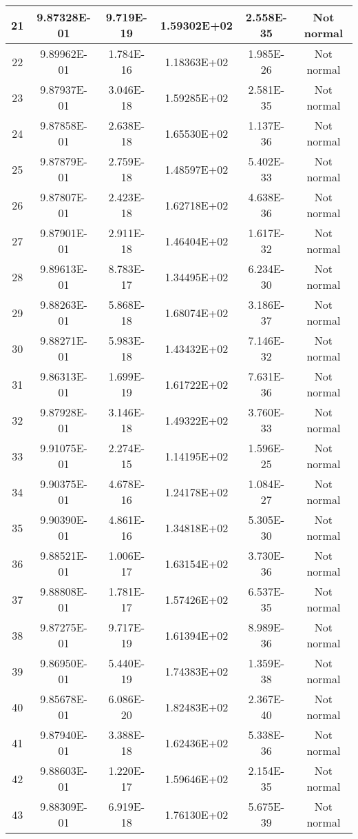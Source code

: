 \begin{table}[h]
\begin{tabular}{|c|c|c|c|c|c|}
		21 & 9.87328E-01 & 9.719E-19 & 1.59302E+02 & 2.558E-35 & Not normal\\\hline
		22 & 9.89962E-01 & 1.784E-16 & 1.18363E+02 & 1.985E-26 & Not normal\\\hline
		23 & 9.87937E-01 & 3.046E-18 & 1.59285E+02 & 2.581E-35 & Not normal\\\hline
		24 & 9.87858E-01 & 2.638E-18 & 1.65530E+02 & 1.137E-36 & Not normal\\\hline
		25 & 9.87879E-01 & 2.759E-18 & 1.48597E+02 & 5.402E-33 & Not normal\\\hline
		26 & 9.87807E-01 & 2.423E-18 & 1.62718E+02 & 4.638E-36 & Not normal\\\hline
		27 & 9.87901E-01 & 2.911E-18 & 1.46404E+02 & 1.617E-32 & Not normal\\\hline
		28 & 9.89613E-01 & 8.783E-17 & 1.34495E+02 & 6.234E-30 & Not normal\\\hline
		29 & 9.88263E-01 & 5.868E-18 & 1.68074E+02 & 3.186E-37 & Not normal\\\hline
		30 & 9.88271E-01 & 5.983E-18 & 1.43432E+02 & 7.146E-32 & Not normal\\\hline
		31 & 9.86313E-01 & 1.699E-19 & 1.61722E+02 & 7.631E-36 & Not normal\\\hline
		32 & 9.87928E-01 & 3.146E-18 & 1.49322E+02 & 3.760E-33 & Not normal\\\hline
		33 & 9.91075E-01 & 2.274E-15 & 1.14195E+02 & 1.596E-25 & Not normal\\\hline
		34 & 9.90375E-01 & 4.678E-16 & 1.24178E+02 & 1.084E-27 & Not normal\\\hline
		35 & 9.90390E-01 & 4.861E-16 & 1.34818E+02 & 5.305E-30 & Not normal\\\hline
		36 & 9.88521E-01 & 1.006E-17 & 1.63154E+02 & 3.730E-36 & Not normal\\\hline
		37 & 9.88808E-01 & 1.781E-17 & 1.57426E+02 & 6.537E-35 & Not normal\\\hline
		38 & 9.87275E-01 & 9.717E-19 & 1.61394E+02 & 8.989E-36 & Not normal\\\hline
		39 & 9.86950E-01 & 5.440E-19 & 1.74383E+02 & 1.359E-38 & Not normal\\\hline
		40 & 9.85678E-01 & 6.086E-20 & 1.82483E+02 & 2.367E-40 & Not normal\\\hline
		41 & 9.87940E-01 & 3.388E-18 & 1.62436E+02 & 5.338E-36 & Not normal\\\hline
		42 & 9.88603E-01 & 1.220E-17 & 1.59646E+02 & 2.154E-35 & Not normal\\\hline
		43 & 9.88309E-01 & 6.919E-18 & 1.76130E+02 & 5.675E-39 & Not normal\\\hline

\end{tabular}
\end{table}
